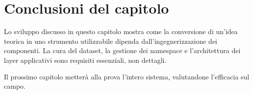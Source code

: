 


\section{Conclusioni del capitolo}\label{sec:conclusioni_cap4}

Lo sviluppo discusso in questo capitolo mostra come la conversione di un'idea teorica in uno strumento utilizzabile dipenda dall'ingegnerizzazione dei componenti. La cura del dataset, la gestione dei namespace e l'architettura dei layer applicativi sono requisiti essenziali, non dettagli.

Il prossimo capitolo metterà alla prova l'intero sistema, valutandone l'efficacia sul campo.
